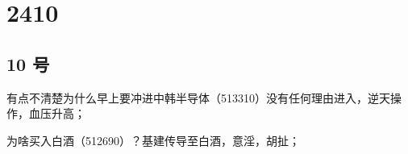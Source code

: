 \section{2410}
\subsection{10 号}
 有点不清楚为什么早上要冲进中韩半导体（513310）没有任何理由进入，逆天操作，血压升高；

 为啥买入白酒（512690）？基建传导至白酒，意淫，胡扯；